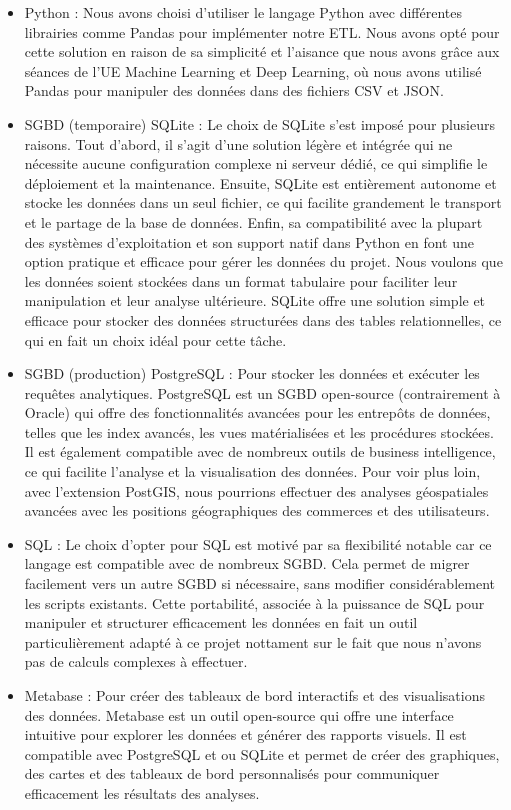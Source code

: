 \begin{itemize}

\item Python : Nous avons choisi d’utiliser le langage Python avec différentes librairies comme Pandas pour implémenter notre ETL. Nous avons opté pour cette solution en raison de sa simplicité et l'aisance que nous avons grâce aux séances de l'UE Machine Learning et Deep Learning, où nous avons utilisé Pandas pour manipuler des données dans des fichiers CSV et JSON\@.
\item SGBD (temporaire) SQLite : Le choix de SQLite s’est imposé pour plusieurs raisons. Tout d’abord, il s’agit d’une solution légère et intégrée qui ne nécessite aucune configuration complexe ni serveur dédié,
ce qui simplifie le déploiement et la maintenance. Ensuite, SQLite est entièrement autonome et stocke les données dans un seul fichier, ce qui facilite grandement le transport et le
partage de la base de données. Enfin, sa compatibilité avec la plupart des systèmes d’exploitation et son support natif dans Python en font une option pratique et efficace pour
gérer les données du projet. Nous voulons que les données soient stockées dans un format tabulaire pour faciliter leur manipulation et leur analyse ultérieure.
SQLite offre une solution simple et efficace pour stocker des données structurées dans des tables relationnelles, ce qui en fait un choix idéal pour cette tâche.
\item SGBD (production) PostgreSQL : Pour stocker les données et exécuter les requêtes analytiques.
PostgreSQL est un SGBD open-source (contrairement à Oracle) qui offre des fonctionnalités avancées pour les entrepôts de données, telles que les index avancés, les vues matérialisées et les procédures stockées.
Il est également compatible avec de nombreux outils de business intelligence, ce qui facilite l’analyse et la visualisation des données. Pour voir plus loin, avec l'extension PostGIS, nous pourrions effectuer des analyses géospatiales avancées avec les positions géographiques des commerces et des utilisateurs.
\item SQL : Le choix d'opter pour SQL est motivé par sa flexibilité notable car ce langage est compatible avec de nombreux SGBD. Cela permet de migrer facilement vers un autre SGBD si nécessaire, sans modifier considérablement les scripts existants.
Cette portabilité, associée à la puissance de SQL pour manipuler et structurer efficacement les données en fait un outil particulièrement adapté à ce projet nottament sur le fait que nous n'avons pas de calculs complexes à effectuer.
\item Metabase : Pour créer des tableaux de bord interactifs et des visualisations des données. Metabase est un outil open-source qui offre une interface intuitive pour explorer les données et générer des rapports visuels.
Il est compatible avec PostgreSQL et ou SQLite et permet de créer des graphiques, des cartes et des tableaux de bord personnalisés pour communiquer efficacement les résultats des analyses.
\end{itemize}

